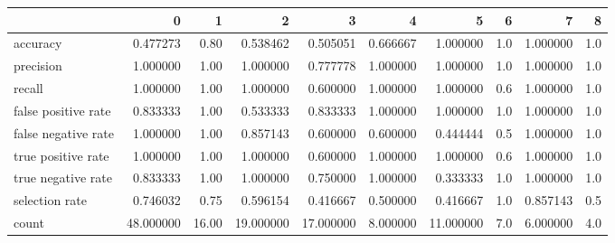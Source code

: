 \begin{tabular}{lrrrrrrrrr}
\toprule
{} &          0 &      1 &          2 &          3 &         4 &          5 &    6 &         7 &    8 \\
\midrule
accuracy            &   0.477273 &   0.80 &   0.538462 &   0.505051 &  0.666667 &   1.000000 &  1.0 &  1.000000 &  1.0 \\
precision           &   1.000000 &   1.00 &   1.000000 &   0.777778 &  1.000000 &   1.000000 &  1.0 &  1.000000 &  1.0 \\
recall              &   1.000000 &   1.00 &   1.000000 &   0.600000 &  1.000000 &   1.000000 &  0.6 &  1.000000 &  1.0 \\
false positive rate &   0.833333 &   1.00 &   0.533333 &   0.833333 &  1.000000 &   1.000000 &  1.0 &  1.000000 &  1.0 \\
false negative rate &   1.000000 &   1.00 &   0.857143 &   0.600000 &  0.600000 &   0.444444 &  0.5 &  1.000000 &  1.0 \\
true positive rate  &   1.000000 &   1.00 &   1.000000 &   0.600000 &  1.000000 &   1.000000 &  0.6 &  1.000000 &  1.0 \\
true negative rate  &   0.833333 &   1.00 &   1.000000 &   0.750000 &  1.000000 &   0.333333 &  1.0 &  1.000000 &  1.0 \\
selection rate      &   0.746032 &   0.75 &   0.596154 &   0.416667 &  0.500000 &   0.416667 &  1.0 &  0.857143 &  0.5 \\
count               &  48.000000 &  16.00 &  19.000000 &  17.000000 &  8.000000 &  11.000000 &  7.0 &  6.000000 &  4.0 \\
\bottomrule
\end{tabular}
